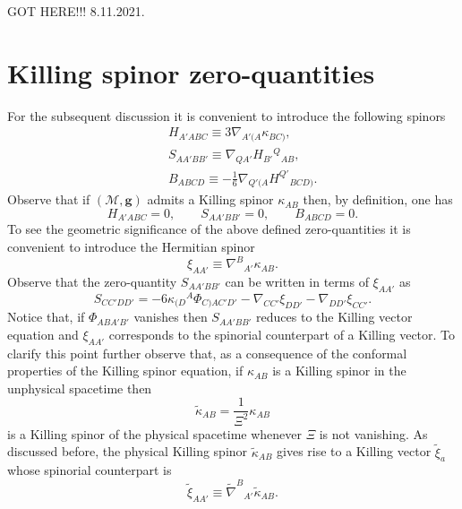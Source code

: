 \documentclass[10pt,a4paper]{article}
\theoremstyle{plain}
\def\bmg{{\bm g}}
\begin{document}
GOT HERE!!! 8.11.2021.

  


\section{Killing spinor zero-quantities}
\label{Sec:KillinSpinorZeroQuantities}


For the subsequent discussion it is convenient to introduce the
following spinors
\begin{subequations}
\begin{eqnarray}
&& H_{A'ABC} \equiv 3
  \nabla_{A'(A}\kappa_{BC)}, \label{DefZeroQuantityH}\\ && S_{AA'BB'}
  \equiv
  \nabla_{QA'}H_{B'}{}^{Q}{}_{AB}, \label{DefZeroQuantityS}\\ &&
  B_{ABCD} \equiv -\frac{1}{6}
  \nabla_{Q'(A}H^{Q'}{}_{BCD)}. \label{DefZeroQuantityB}
\end{eqnarray}
\end{subequations}
Observe that if $(\mathcal{M},\bmg)$ admits a Killing spinor
$\kappa_{AB}$ then, by definition, one has
\[
H_{A'ABC}=0, \qquad S_{AA'BB'}=0, \qquad B_{ABCD}=0.
\]
To see the geometric significance of the above defined zero-quantities
it is convenient to introduce the Hermitian spinor
\begin{equation}\label{DefAuxiliaryVector}
 \xi_{AA'} \equiv \nabla^{B}{}_{A'}\kappa_{AB}.
\end{equation}
Observe that the zero-quantity $S_{AA'BB'}$ can be written in terms of
$\xi_{AA'}$ as
\begin{equation}\label{DefinitionZeroQuantitySIntersmOfAuxiliaryV}
S_{CC'DD'}=-6\kappa_{(D}{}^{A}\Phi_{C)AC'D'} - \nabla_{CC'}\xi_{DD'} -
\nabla_{DD'}\xi_{CC'}.
\end{equation}
Notice that, if $\Phi_{ABA'B'}$ vanishes then $S_{AA'BB'}$ reduces to
the Killing vector equation and $\xi_{AA'}$ corresponds to the
spinorial counterpart of a Killing vector.  To clarify this point
further observe that, as a consequence of the conformal properties of
the Killing spinor equation, if $\kappa_{AB}$ is a Killing spinor in
the unphysical spacetime
then \[\tilde{\kappa}_{AB}=\frac{1}{\Xi^2}\kappa_{AB}\] is a Killing
spinor of the physical spacetime whenever $\Xi$ is not vanishing.  As
discussed before, the physical Killing spinor $\tilde{\kappa}_{AB}$
gives rise to a Killing vector $\tilde{\xi}_{a}$ whose spinorial
counterpart is
\begin{equation}
 \tilde{\xi}_{AA'} \equiv \tilde{\nabla}^{B}{}_{A'}\tilde{\kappa}_{AB}.
\end{equation}
\end{document}
